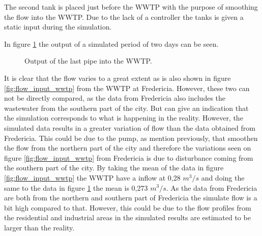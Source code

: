 The second tank is placed just before the WWTP with the purpose of smoothing the flow into the WWTP. %
Due to the lack of a controller the tanks is given a static input during the simulation.

In figure \ref{fig:simulation_output_first} the output of a simulated period of two days can be seen. 

\begin{figure}[H]
\centering

\caption{Output of the last pipe into the WWTP.}
\label{fig:simulation_output_first}
\end{figure}  

It is clear that the flow varies to a great extent as is also shown in figure \ref{fig:flow_input_wwtp} from the WWTP at Fredericia. However, these two can not be directly compared, as the data from Fredericia also includes the wastewater from the southern part of the city. But can give an indication that the simulation corresponds to what is happening in the reality. However, the simulated data results in a greater variation of flow than the data obtained from Fredericia. This could be due to the pump, as mention previously, that smoothen the flow from the northern part of the city and therefore the variations seen on figure \ref{fig:flow_input_wwtp} from Fredericia is due to disturbance coming from the southern part of the city. By taking the mean of the data in figure \ref{fig:flow_input_wwtp} the WWTP have a inflow at 0,28 $m^3/s$ and doing the same to the data in figure \ref{fig:simulation_output_first} the mean is 0,273 $m^3/s$. As the data from Fredericia are both from the northern and southern part of Fredericia the simulate flow is a bit high compared to that. However, this could be due to the flow profiles from the residential and industrial areas in the simulated results are estimated to be larger than the reality.     

